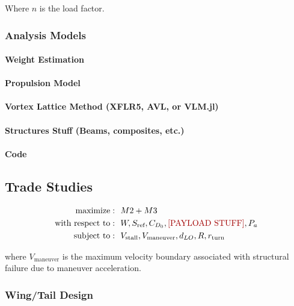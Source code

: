 \documentclass[report]{byu-aero}
\begin{document}
Where \(n\) is the load factor.

\subsubsection{Analysis Models}


\paragraph{Weight Estimation}


\paragraph{Propulsion Model}


\paragraph{Vortex Lattice Method (XFLR5, AVL, or VLM.jl)}


\paragraph{Structures Stuff (Beams, composites, etc.)}


\paragraph{Code}




\subsection{Trade Studies}
\label{ssec:tradestudies}

\begin{equation}
	\label{eqn:optdef}
	\begin{aligned}
		\text{maximize}: 
		& ~~M2 + M3 \\
		\text{with respect to}:
		& ~~W, S_\text{ref}, C_{D_0}, \text{\color{\BYUred} [PAYLOAD STUFF]}, P_a \\
		\text{subject to}: 
		& ~~V_\text{stall}, V_\text{maneuver}, d_{LO}, R, r_\text{turn}
	\end{aligned}
\end{equation}

where \(V_\text{maneuver}\) is the maximum velocity boundary associated with structural failure due to maneuver acceleration.


\subsubsection{Wing/Tail Design}
\end{document}
